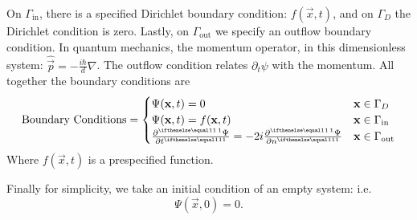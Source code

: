 \documentclass[../../main.tex]{subfiles}
\begin{document}
On $\Gamma_\mathrm{in}$, there is a specified Dirichlet boundary condition:
$f(\vec x, t)$, and on $\Gamma_D$ the Dirichlet condition is zero.
Lastly, on $\Gamma_\mathrm{out}$ we specify an outflow boundary condition.
In quantum mechanics, the momentum operator, 
in this dimensionless system: $\hat{\vec p} = -\frac{i \hbar}{d} \nabla$.
The outflow condition relates $\partial_t \psi$ with the momentum. 
All together the boundary conditions are
\begin{equation}
		\label{eq:boundary-conditions}
		\text{Boundary Conditions} = 
		\begin{cases}
				\Psi(\vec x, t) = 0 & \vec x \in \Gamma_D \\
				\Psi(\vec x, t) = f(\vec x, t) & \vec x \in \Gamma_\mathrm{in}
				\\
				\pder{\Psi}{t} = -2i  \pder{\Psi}{n} & 
				\vec x \in \Gamma_\mathrm{out}
		\end{cases}
\end{equation}
Where $f(\vec x, t)$ is a prespecified function.

Finally for simplicity, we take an initial condition of 
an empty system: i.e.
\[
		\Psi(\vec x, 0) = 0
.\] 
\end{document}
